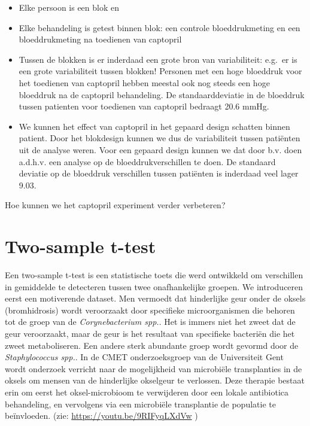 \documentclass[
  12pt,dutch,coursenotes]{book}
\begin{document}
\begin{itemize}
\item
  Elke persoon is een blok en
\item
  Elke behandeling is getest binnen blok: een controle bloeddrukmeting en een bloeddrukmeting na toedienen van captopril
\item
  Tussen de blokken is er inderdaad een grote bron van variabiliteit: e.g.~er is een grote variabiliteit tussen blokken! Personen met een hoge bloeddruk voor het toedienen van captopril hebben meestal ook nog steeds een hoge bloeddruk na de captopril behandeling. De standaarddeviatie in de bloeddruk tussen patienten voor toedienen van captopril bedraagt 20.6 mmHg.
\item
  We kunnen het effect van captopril in het gepaard design schatten binnen patient. Door het blokdesign kunnen we dus de variabiliteit tussen patiënten uit de analyse weren. Voor een gepaard design kunnen we dat door b.v. doen a.d.h.v. een analyse op de bloeddrukverschillen te doen. De standaard deviatie op de bloeddruk verschillen tussen patiënten is inderdaad veel lager 9.03.
\end{itemize}

Hoe kunnen we het captopril experiment verder verbeteren?

\hypertarget{two-sample-t-test}{%
\section{Two-sample t-test}\label{two-sample-t-test}}

Een two-sample t-test is een statistische toets die werd ontwikkeld om verschillen in gemiddelde te detecteren tussen twee onafhankelijke groepen. We introduceren eerst een motiverende dataset.
Men vermoedt dat hinderlijke geur onder de oksels (bromhidrosis) wordt veroorzaakt door specifieke microorganismen die behoren tot de groep van de \emph{Corynebacterium spp.}. Het is immers niet het zweet dat de geur veroorzaakt, maar de geur is het resultaat van specifieke bacteriën die het zweet metaboliseren. Een andere sterk abundante groep wordt gevormd door de \emph{Staphylococcus spp.}. In de CMET onderzoeksgroep van de Universiteit Gent wordt onderzoek verricht naar de mogelijkheid van microbiële transplanties in de oksels om mensen van de hinderlijke okselgeur te verlossen. Deze therapie bestaat erin om eerst het oksel-microbioom te verwijderen door een lokale antibiotica behandeling, en vervolgens via een microbiële transplantie de populatie te beïnvloeden. (zie: \url{https://youtu.be/9RIFyqLXdVw} )
\end{document}
